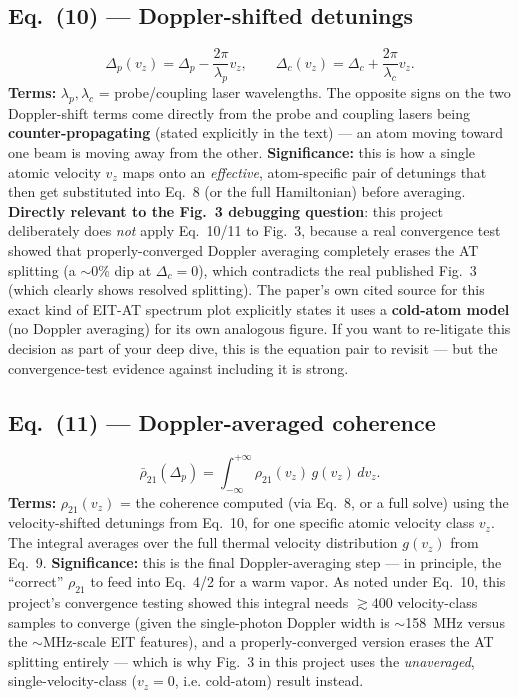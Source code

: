 \documentclass[11pt]{article}
\begin{document}
\subsection*{Eq.~(10) --- Doppler-shifted detunings}
\begin{equation}
\Delta_p(v_z)=\Delta_p-\frac{2\pi}{\lambda_p}v_z,\qquad
\Delta_c(v_z)=\Delta_c+\frac{2\pi}{\lambda_c}v_z. \tag{10}
\end{equation}
\textbf{Terms:} $\lambda_p,\lambda_c$ = probe/coupling laser
wavelengths. The opposite signs on the two Doppler-shift terms come
directly from the probe and coupling lasers being
\textbf{counter-propagating} (stated explicitly in the text) --- an
atom moving toward one beam is moving away from the other.
\textbf{Significance:} this is how a single atomic velocity $v_z$ maps
onto an \emph{effective}, atom-specific pair of detunings that then get
substituted into Eq.~8 (or the full Hamiltonian) before averaging.
\textbf{Directly relevant to the Fig.~3 debugging question}: this
project deliberately does \emph{not} apply Eq.~10/11 to Fig.~3, because
a real convergence test showed that properly-converged Doppler
averaging completely erases the AT splitting (a $\sim$0\% dip at
$\Delta_c=0$), which contradicts the real published Fig.~3 (which
clearly shows resolved splitting). The paper's own cited source for
this exact kind of EIT-AT spectrum plot explicitly states it uses a
\textbf{cold-atom model} (no Doppler averaging) for its own analogous
figure. If you want to re-litigate this decision as part of your deep
dive, this is the equation pair to revisit --- but the convergence-test
evidence against including it is strong.

\subsection*{Eq.~(11) --- Doppler-averaged coherence}
\begin{equation}
\bar\rho_{21}(\Delta_p)=\int_{-\infty}^{+\infty}\rho_{21}(v_z)\,g(v_z)\,dv_z. \tag{11}
\end{equation}
\textbf{Terms:} $\rho_{21}(v_z)$ = the coherence computed (via Eq.~8, or
a full solve) using the velocity-shifted detunings from Eq.~10, for one
specific atomic velocity class $v_z$. The integral averages over the
full thermal velocity distribution $g(v_z)$ from Eq.~9.
\textbf{Significance:} this is the final Doppler-averaging step ---
in principle, the ``correct'' $\rho_{21}$ to feed into Eq.~4/2 for a
warm vapor. As noted under Eq.~10, this project's convergence testing
showed this integral needs $\gtrsim400$ velocity-class samples to
converge (given the single-photon Doppler width is $\sim$158~MHz versus
the $\sim$MHz-scale EIT features), and a properly-converged version
erases the AT splitting entirely --- which is why Fig.~3 in this
project uses the \emph{unaveraged}, single-velocity-class ($v_z=0$,
i.e. cold-atom) result instead.
\end{document}
